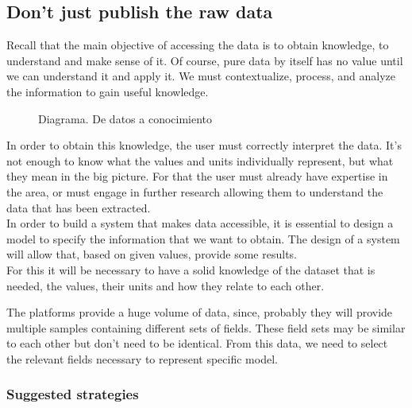 \subsection{Don't just publish the raw data}

Recall that the main objective of accessing the data is to obtain knowledge, to understand and make sense of it.
Of course, pure data by itself has no value until we can understand it and apply it.
We must contextualize, process, and analyze the information to gain useful knowledge. \\ 
    
\begin{figure}[ht]
    \centering 
    \caption{Diagrama. De datos a conocimiento}
\end{figure}
 
In order to obtain this knowledge, the user must correctly interpret the data.
It's not enough to know what the values and units individually represent, but what they mean in the big picture.
For that the user must already have expertise in the area, or must engage in further research allowing them to understand the data that has been extracted.\\
    
In order to build a system that makes data accessible, it is essential to design a model to specify the information that we want to obtain.
The design of a system will allow that, based on given values, provide some results.\\

For this it will be necessary to have a solid knowledge of the dataset that is needed, the values, their units and how they relate to each other.

The platforms provide a huge volume of data, since, probably they will provide multiple samples containing different sets of fields. 
These field sets may be similar to each other but don't need to be identical.
From this data, we need to select the relevant fields necessary to represent specific model.\\

\subsubsection*{Suggested strategies} 

